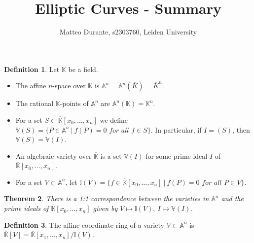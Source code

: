 \documentclass{article}
\newcommand{\numberset}{\mathbb}
\newcommand{\K}{\numberset{K}}
\newcommand{\I}{\mathbb{I}}
\newcommand{\V}{\mathbb{V}}
\theoremstyle{plain}
\newtheorem{thm}{Theorem}
\theoremstyle{definition}
\newtheorem{defn}[thm]{Definition}
\begin{document}
\title{Elliptic Curves - Summary}

\author{Matteo Durante, s2303760, Leiden University}

\maketitle

\begin{defn}
    Let $\K$ be a field.
    \begin{itemize}
        \item The affine $n$-space over $\K$ is
            $\mathbb{A}^n=\mathbb{A}^n(\overline{K})=\overline{K}^n$.
        \item The rational $\K$-points of $\mathbb{A}^n$ are $\mathbb{A}^n(\K)=
            \K^n$.
        \item For a set $S\subset\overline{\K}[x_0,\ldots,x_n]$ we define
            $\V(S)=\{P\in\mathbb{A}^n\ |\ f(P)=0\textit{ for all }f\in S\}$. In
            particular, if $I=(S)$, then $\V(S)=\V(I)$.
        \item An algebraic variety over $\overline{\K}$ is a set $\V(I)$ for some
            prime ideal $I$ of $\overline{\K}[x_0,\ldots,x_n]$.
        \item For a set $V\subset\mathbb{A}^n$, let
            $\I(V)=\{f\in\overline{\K}[x_0,\ldots,x_n]\ |\ f(P)=0\textit{ for 
            all }P\in V\}$.
    \end{itemize}
\end{defn}

\begin{thm}
    There is a 1:1 correspondence between the varieties in $\mathbb{A}^n$ and
    the prime ideals of $\overline{\K}[x_0,\ldots,x_n]$ given by
    $V\mapsto\I(V),\ I\mapsto\V(I)$.
\end{thm}

\begin{defn}
    The affine coordinate ring of a variety $V\subset\mathbb{A}^n$ is
    $\overline{\K}[V]=\overline{\K}[x_1,\ldots,x_n]/\I(V)$.
\end{defn}

\printbibliography
\end{document}
